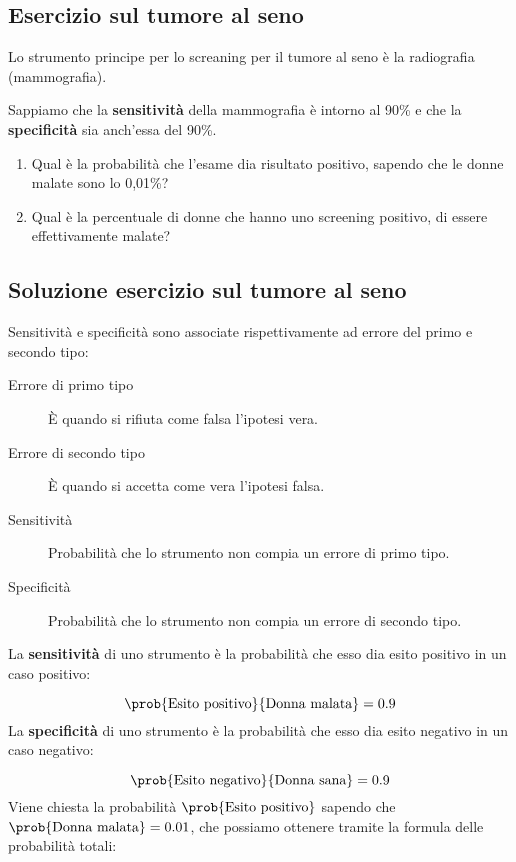\documentclass[\main/main.tex]{subfiles}
\begin{document}
\subsection{Esercizio sul tumore al seno}
Lo strumento principe per lo screaning per il tumore al seno è la radiografia (mammografia).

Sappiamo che la \textbf{sensitività} della mammografia è intorno al 90\% e che la \textbf{specificità} sia anch'essa del 90\%.

\begin{enumerate}
  \item Qual è la probabilità che l'esame dia risultato positivo, sapendo che le donne malate sono lo 0,01\%?
  \item Qual è la percentuale di donne che hanno uno screening positivo, di essere effettivamente malate?
\end{enumerate}

\subsection{Soluzione esercizio sul tumore al seno}
Sensitività e specificità sono associate rispettivamente ad errore del primo e secondo tipo:

\begin{description}
  \item[Errore di primo tipo] È quando si rifiuta come falsa l'ipotesi vera.
  \item[Errore di secondo tipo] È quando si accetta come vera l'ipotesi falsa.
\end{description}

\begin{description}
  \item[Sensitività] Probabilità che lo strumento non compia un errore di primo tipo.
  \item[Specificità] Probabilità che lo strumento non compia un errore di secondo tipo.
\end{description}


La \textbf{sensitività} di uno strumento è la probabilità che esso dia esito positivo in un caso positivo:

\[
  \prob{\text{Esito positivo}}{\text{Donna malata}} = 0.9
\]
La \textbf{specificità} di uno strumento è la probabilità che esso dia esito negativo in un caso negativo:

\[
  \prob{\text{Esito negativo}}{\text{Donna sana}} = 0.9
\]
Viene chiesta la probabilità $\prob{\text{Esito positivo}}$ sapendo che $\prob{\text{Donna malata}}=0.01$, che possiamo ottenere tramite la formula delle probabilità totali:
\end{document}
